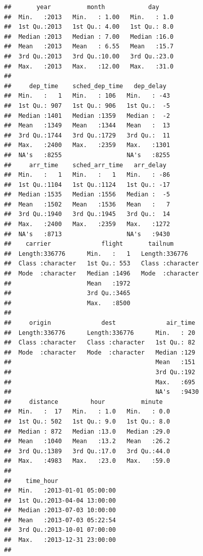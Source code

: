 \documentclass[]{book}
\begin{document}
\begin{verbatim}
##       year          month            day      
##  Min.   :2013   Min.   : 1.00   Min.   : 1.0  
##  1st Qu.:2013   1st Qu.: 4.00   1st Qu.: 8.0  
##  Median :2013   Median : 7.00   Median :16.0  
##  Mean   :2013   Mean   : 6.55   Mean   :15.7  
##  3rd Qu.:2013   3rd Qu.:10.00   3rd Qu.:23.0  
##  Max.   :2013   Max.   :12.00   Max.   :31.0  
##                                               
##     dep_time    sched_dep_time   dep_delay   
##  Min.   :   1   Min.   : 106   Min.   : -43  
##  1st Qu.: 907   1st Qu.: 906   1st Qu.:  -5  
##  Median :1401   Median :1359   Median :  -2  
##  Mean   :1349   Mean   :1344   Mean   :  13  
##  3rd Qu.:1744   3rd Qu.:1729   3rd Qu.:  11  
##  Max.   :2400   Max.   :2359   Max.   :1301  
##  NA's   :8255                  NA's   :8255  
##     arr_time    sched_arr_time   arr_delay   
##  Min.   :   1   Min.   :   1   Min.   : -86  
##  1st Qu.:1104   1st Qu.:1124   1st Qu.: -17  
##  Median :1535   Median :1556   Median :  -5  
##  Mean   :1502   Mean   :1536   Mean   :   7  
##  3rd Qu.:1940   3rd Qu.:1945   3rd Qu.:  14  
##  Max.   :2400   Max.   :2359   Max.   :1272  
##  NA's   :8713                  NA's   :9430  
##    carrier              flight       tailnum         
##  Length:336776      Min.   :   1   Length:336776     
##  Class :character   1st Qu.: 553   Class :character  
##  Mode  :character   Median :1496   Mode  :character  
##                     Mean   :1972                     
##                     3rd Qu.:3465                     
##                     Max.   :8500                     
##                                                      
##     origin              dest              air_time   
##  Length:336776      Length:336776      Min.   : 20   
##  Class :character   Class :character   1st Qu.: 82   
##  Mode  :character   Mode  :character   Median :129   
##                                        Mean   :151   
##                                        3rd Qu.:192   
##                                        Max.   :695   
##                                        NA's   :9430  
##     distance         hour          minute    
##  Min.   :  17   Min.   : 1.0   Min.   : 0.0  
##  1st Qu.: 502   1st Qu.: 9.0   1st Qu.: 8.0  
##  Median : 872   Median :13.0   Median :29.0  
##  Mean   :1040   Mean   :13.2   Mean   :26.2  
##  3rd Qu.:1389   3rd Qu.:17.0   3rd Qu.:44.0  
##  Max.   :4983   Max.   :23.0   Max.   :59.0  
##                                              
##    time_hour                  
##  Min.   :2013-01-01 05:00:00  
##  1st Qu.:2013-04-04 13:00:00  
##  Median :2013-07-03 10:00:00  
##  Mean   :2013-07-03 05:22:54  
##  3rd Qu.:2013-10-01 07:00:00  
##  Max.   :2013-12-31 23:00:00  
## 
\end{verbatim}
\end{document}
